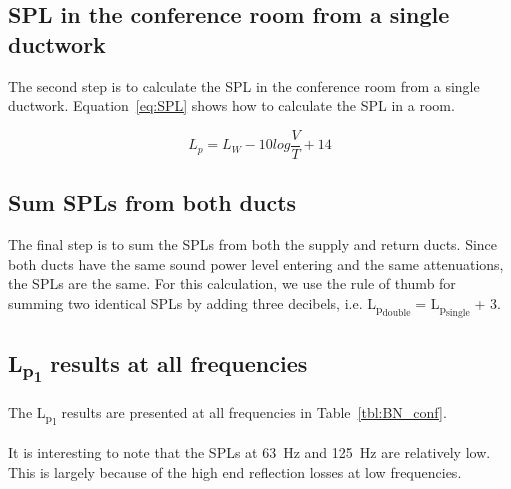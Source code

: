 \subsection{SPL in the conference room from a single ductwork}

The second step is to calculate the SPL in the conference room from a single ductwork.
Equation~\ref{eq:SPL} shows how to calculate the SPL in a room.

	\begin{equation}\label{eq:SPL}
		L_{p} = L_{W} - 10 log \frac{V}{T} + 14
	\end{equation}


\subsection{Sum SPLs from both ducts}

The final step is to sum the SPLs from both the supply and return ducts.
Since both ducts have the same sound power level entering and the same attenuations, the SPLs are the same.
For this calculation, we use the rule of thumb for summing two identical SPLs by adding three decibels, i.e. L\textsubscript{p\textsubscript{double}} = L\textsubscript{p\textsubscript{single}} + 3.


\subsection{L\textsubscript{p\textsubscript{1}} results at all frequencies}

The L\textsubscript{p\textsubscript{1}} results are presented at all frequencies in Table~\ref{tbl:BN_conf}.

It is interesting to note that the SPLs at 63~Hz and 125~Hz are relatively low.
This is largely because of the high end reflection losses at low frequencies.



